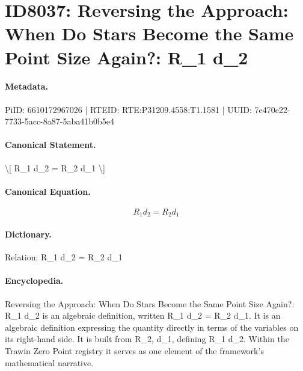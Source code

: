 \section*{ID8037: Reversing the Approach: When Do Stars Become the Same Point Size Again?: R\_1 d\_2}
\paragraph{Metadata.}
PiID: 6610172967026 | RTEID: RTE:P31209.4558:T1.1581 | UUID: 7e470e22-7733-5acc-8a87-5aba41b0b5e4

\paragraph{Canonical Statement.}
\textbackslash{}[ R\_1 d\_2 = R\_2 d\_1 \textbackslash{}]

\paragraph{Canonical Equation.}
\[
R_1 d_2 = R_2 d_1
\]

\paragraph{Dictionary.}
Relation: R\_1 d\_2 = R\_2 d\_1

\paragraph{Encyclopedia.}
Reversing the Approach: When Do Stars Become the Same Point Size Again?: R\_1 d\_2 is an algebraic definition, written R\_1 d\_2 = R\_2 d\_1. It is an algebraic definition expressing the quantity directly in terms of the variables on its right-hand side. It is built from R\_2, d\_1, defining R\_1 d\_2. Within the Trawin Zero Point registry it serves as one element of the framework's mathematical narrative.
